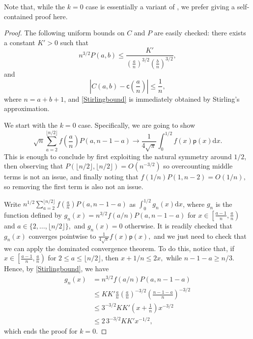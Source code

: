 \documentclass[11pt]{article}
\newcommand{\pp}{\mathsf{p}}
\newcommand{\cc}{\mathsf{c}}
\renewcommand{\geq}{\geqslant}
\renewcommand{\leq}{\leqslant}
\newcommand{\dd}{\mathrm{d}}
\begin{document}
Note that, while the $k=0$ case is essentially a variant of \cite[Proposition 39]{HM12}, we prefer giving a self-contained proof here.
\begin{proof} The following uniform bounds on $C$ and $P$ are easily checked: there exists a constant $K'>0$ such that
\begin{equation}\label{Stirlingbound}
n^{3/2} P(a,b) \leq \frac{K'}{(\frac{a}{n})^{3/2}(\frac{b}{n})^{3/2}},
\end{equation}
and  
\begin{equation}\label{eq:boundc1}
\left|C(a,b)-\cc{\left(\frac{a}{n}\right)}\right|\leq\frac1n,
\end{equation}
where $n=a+b+1$, and \eqref{Stirlingbound} is immediately obtained by Stirling's approximation.

We start with the $k=0$ case. Specifically, we are going to show
\[
    \sqrt{n} \sum_{a=2}^{\lfloor n/2\rfloor} f{\left(\frac{a}{n}\right)}P(a,n-1-a) \longrightarrow \frac{1}{4\sqrt{\pi}}\int_0^{1/2} f(x) \pp(x) \dd x.
\]
This is enough to conclude by first exploiting the natural symmetry around $1/2$, then observing that $P(\lfloor n/2\rfloor,\lfloor n/2 \rfloor )=O(n^{-3/2})$ so overcounting middle terms is not an issue, and finally noting that $f(1/n)P(1,n-2)=O(1/n),$ so removing the first term is also not an issue.

Write $n^{1/2}\sum_{a=2}^{\lfloor n/2\rfloor} f(\frac{a}{n})P(a,n-1-a)$ as $\int_{0}^{1/2} g_n(x)\mathrm{d}x$, where $g_n$ is the function defined by $g_n(x)=n^{3/2}f(a/n)P(a,n-1-a)$ for $x\in \left[\frac{a-1}{n},\frac{a}{n}\right)$ and $a\in \{2,\ldots,\lfloor n/2\rfloor\},$ and $g_n(x)=0$ otherwise. It is readily checked that $g_n(x)$ converges pointwise to $\frac1{4\sqrt{\pi}}f(x) \pp(x),$ and we just need to check that we can apply the dominated convergence theorem. To do this, notice that, if $x\in \left[\frac{a-1}{n},\frac{a}{n}\right)$ for $2\leq a \leq \lfloor n/2\rfloor$, then $x+1/n\leq 2x,$ while $n-1-a\geq n/3$. Hence, by \eqref{Stirlingbound}, we have
\begin{align*}
    g_n(x)& =n^{3/2}f(a/n)P(a,n-1-a) \\
    &\leq KK'\frac{a}{n} \left(\frac{a}{n}\right)^{-3/2}\left(\frac{n-1-a}{n}\right)^{-3/2} \\
    &\leq 3^{-3/2}KK'   \left(x+\frac{1}{n}\right)x^{-3/2} \\
    &\leq 2\,3^{-3/2}KK'x^{-1/2},
\end{align*}
which ends the proof for $k=0$. 




\end{proof}
\end{document}
